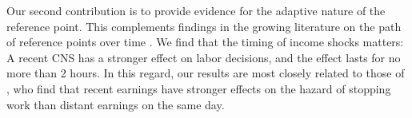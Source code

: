\documentclass[reviewmode,AEJ]{AEA}
\begin{document}
%
%

Our second contribution is to provide evidence for the adaptive nature
of the reference point. This complements findings in the growing literature on the path of reference points
over time \citep{dellavigna2017reference,thakral2018daily}. We find that the timing of income shocks matters:
A recent CNS has a stronger effect on labor decisions, and the effect lasts for no more than 2 hours. 
In this regard, our results are most closely related to those of \citet{thakral2018daily}, who find that 
recent earnings have stronger effects on the hazard of stopping work than distant earnings on the same day.
\end{document}
